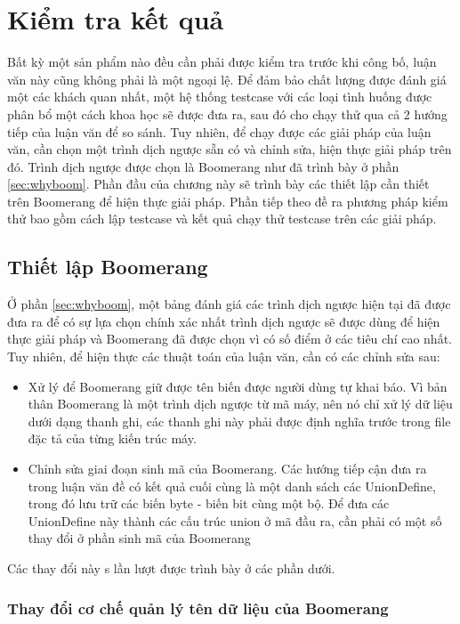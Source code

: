 \chapter{Kiểm tra kết quả}

Bất kỳ một sản phẩm nào đều cần phải được kiểm tra trước khi công bố, luận văn này cũng không phải là một ngoại lệ. Để đảm bảo chất lượng được đánh giá một các khách quan nhất, một hệ thống testcase với các loại tình huống được phân bổ một cách khoa học sẽ được đưa ra, sau đó cho chạy thử qua cả 2 hướng tiếp của luận văn để so sánh. Tuy nhiên, để chạy được các giải pháp của luận văn, cần chọn một trình dịch ngược sẵn có và chỉnh sửa, hiện thực giải pháp trên đó. Trình dịch ngược được chọn là Boomerang như đã trình bày ở phần \ref{sec:whyboom}. Phần đầu của chương này sẽ trình bày các thiết lập cần thiết trên Boomerang để hiện thực giải pháp. Phần tiếp theo đề ra phương pháp kiểm thử bao gồm cách lập testcase và kết quả chạy thử testcase trên các giải pháp.

\section{Thiết lập Boomerang}

\label{sec:boomchange}
Ở phần \ref{sec:whyboom}, một bảng đánh giá các trình dịch ngược hiện tại đã được đưa ra để có sự lựa chọn chính xác nhất trình dịch ngược sẽ được dùng để hiện thực giải pháp và Boomerang đã được chọn vì có số điểm ở các tiêu chí cao nhất. Tuy nhiên, để hiện thực các thuật toán của luận văn, cần có các chỉnh sửa sau:
\begin{itemize}
	\item Xử lý để Boomerang giữ được tên biến được người dùng tự khai báo. Vì bản thân Boomerang là một trình dịch ngược từ mã máy, nên nó chỉ xử lý dữ liệu dưới dạng thanh ghi, các thanh ghi này phải được định nghĩa trước trong file đặc tả của từng kiến trúc máy.
	\item Chỉnh sửa giai đoạn sinh mã của Boomerang. Các hướng tiếp cận đưa ra trong luận văn đề có kết quả cuối cùng là một danh sách các UnionDefine, trong đó lưu trữ các biến byte - biến bit cùng một bộ. Để đưa các UnionDefine này thành các cấu trúc union ở mã đầu ra, cần phải có một số thay đổi ở phần sinh mã của Boomerang
\end{itemize}
Các thay đổi này s	 lần lượt được trình bày ở các phần dưới.

\subsection{Thay đổi cơ chế quản lý tên dữ liệu của Boomerang}

